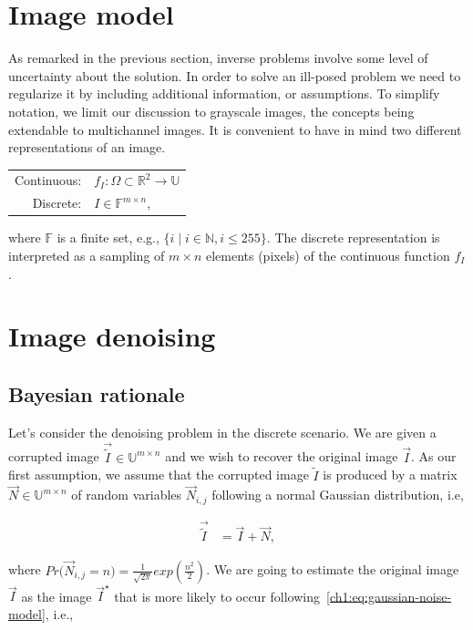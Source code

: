 \section{Image model}
As remarked in the previous section, inverse problems involve some level of uncertainty about the solution. In order to solve an ill-posed problem we need to regularize it by including additional information, or assumptions. To simplify notation, we limit our discussion to grayscale images, the concepts being extendable to multichannel images. It is convenient to have in mind two different representations of an image. \\

\begin{center}
\begin{tabular}{rl}
	Continuous: & $f_I: \Omega \subset \mathbb{R}^2 \rightarrow \mathbb{U}$ \\
	Discrete: & $I \in \mathbb{F}^{m \times n}$,
\end{tabular}
\end{center}

where $\mathbb{F}$ is a finite set, e.g., $\{ i \; | \; i \in \mathbb{N}, i \leq 255 \}$. The discrete representation is interpreted as a sampling of $m \times n$ elements (pixels) of the continuous function $f_I$. 

\section{Image denoising}

\subsection{Bayesian rationale}

Let's consider the denoising problem in the discrete scenario. We are given a corrupted image $\vec{\widetilde{I}} \in \mathbb{U}^{m \times n}$ and we wish to recover the original image $\vec{I}$. As our first assumption, we assume that the corrupted image $\widetilde{I}$ is produced by a matrix $\vec{N} \in \mathbb{U}^{m \times n}$ of random variables $\vec{N}_{i,j}$ following a normal Gaussian distribution, i.e, 

\begin{align}
	\vec{\widetilde{I}} &= \vec{I} + \vec{N},
	\label{ch1:eq:gaussian-noise-model}
\end{align} 

where $Pr\big( \vec{N}_{i,j} = n \big) = \frac{1}{\sqrt{2\pi}}exp( \frac{n^2}{2} )$. We are going to estimate the original image $\vec{I}$ as the image $\vec{I}^{\star}$ that is more likely to occur following~\cref{ch1:eq:gaussian-noise-model}, i.e., 

